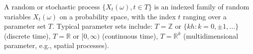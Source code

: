 A random or stochastic process $\{X_t(\omega), t \in T\}$ is an indexed family of random variables $X_t(\omega)$ on a probability space, with the index $t$ ranging over a parameter set $T$. Typical parameter sets include: $T = \mathbb{Z}$ or $\{kh : k = 0, \pm 1, \ldots\}$ (discrete time), $T = \mathbb{R}$ or $[0, \infty)$ (continuous time), $T = \mathbb{R}^k$ (multidimensional parameter, e.g., spatial processes).
